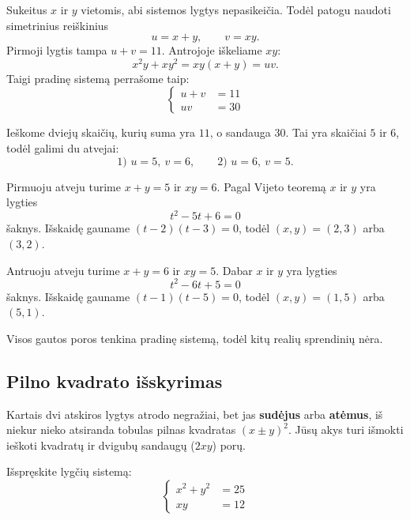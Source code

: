 \documentclass[11pt,a4paper]{scrartcl}
\begin{document}
\begin{solution}
Sukeitus $x$ ir $y$ vietomis, abi sistemos lygtys nepasikeičia. Todėl patogu naudoti simetrinius reiškinius
\[ u=x+y, \qquad v=xy. \]
Pirmoji lygtis tampa $u+v=11$. Antrojoje iškeliame $xy$:
\[ x^2y+xy^2=xy(x+y)=uv. \]
Taigi pradinę sistemą perrašome taip:
\[
\left\{\begin{aligned}
    u+v&=11 \\
    uv&=30
\end{aligned}\right.
\]

Ieškome dviejų skaičių, kurių suma yra $11$, o sandauga $30$. Tai yra skaičiai $5$ ir $6$, todėl galimi du atvejai:
\[
\text{1) } u=5,\ v=6, \qquad \text{2) } u=6,\ v=5.
\]

Pirmuoju atveju turime $x+y=5$ ir $xy=6$. Pagal Vijeto teoremą $x$ ir $y$ yra lygties
\[
t^2-5t+6=0
\]
šaknys. Išskaidę gauname $(t-2)(t-3)=0$, todėl $(x,y)=(2,3)$ arba $(3,2)$.

Antruoju atveju turime $x+y=6$ ir $xy=5$. Dabar $x$ ir $y$ yra lygties
\[
t^2-6t+5=0
\]
šaknys. Išskaidę gauname $(t-1)(t-5)=0$, todėl $(x,y)=(1,5)$ arba $(5,1)$.

Visos gautos poros tenkina pradinę sistemą, todėl kitų realių sprendinių nėra.

\end{solution}

\subsection{Pilno kvadrato išskyrimas}
Kartais dvi atskiros lygtys atrodo negražiai, bet jas \textbf{sudėjus} arba \textbf{atėmus}, iš niekur nieko atsiranda tobulas pilnas kvadratas $(x \pm y)^2$. Jūsų akys turi išmokti ieškoti kvadratų ir dvigubų sandaugų ($2xy$) porų.

\begin{example}
Išspręskite lygčių sistemą:
\[
\left\{\begin{aligned}
    x^2 + y^2 &= 25 \\
    xy &= 12
\end{aligned}\right.
\]
\end{example}
\end{document}
